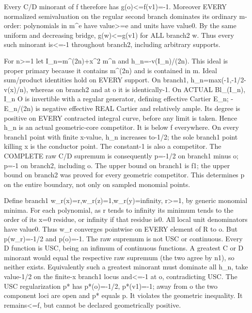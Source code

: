 Every C/D minorant of f therefore has g(o)\textless{}=f(v1)=-1. Moreover EVERY normalized semivaluation on the regular second branch dominates its ordinary m-order: polynomials in m\textasciicircum{}e have value\textgreater{}=e and units have value0. By the same uniform and decreasing bridge, g(w)\textless{}=g(v1) for ALL branch2 w. Thus every such minorant is\textless{}=-1 throughout branch2, including arbitrary supports.

For n\textgreater{}=1 let I\_n=m\textasciicircum{}(2n)+x\textasciicircum{}2 m\textasciicircum{}n and h\_n=-v(I\_n)/(2n). This ideal is proper primary because it contains m\textasciicircum{}(2n) and is contained in m. Ideal sum/product identities hold on EVERY support. On branch1,
h\_n=max(-1,-1/2-v(x)/n),
whereas on branch2 and at o it is identically-1. On ACTUAL Bl\_(I\_n), I\_n O is invertible with a regular generator, defining effective Cartier E\_n; -E\_n/(2n) is negative effective REAL Cartier and relatively ample. Its degree is positive on EVERY contracted integral curve, before any limit is taken. Hence h\_n is an actual geometric-core competitor. It is below f everywhere. On every branch1 point with finite x-value, h\_n increases to-1/2; the sole branch1 point killing x is the conductor point. The constant-1 is also a competitor. The COMPLETE raw C/D supremum is consequently
p=-1/2 on branch1 minus o; p=-1 on branch2, including o.
The upper bound on branch1 is f1; the upper bound on branch2 was proved for every geometric competitor. This determines p on the entire boundary, not only on sampled monomial points.

Define branch1 w\_r(x)=r,w\_r(z)=1,w\_r(y)=infinity, r\textgreater{}=1, by generic monomial minima. For each polynomial, as r tends to infinity its minimum tends to the order of its x=0 residue, or infinity if that residue is0. All local unit denominators have value0. Thus w\_r converges pointwise on EVERY element of R to o. But p(w\_r)=-1/2 and p(o)=-1. The raw supremum is not USC or continuous. Every D function is USC, being an infimum of continuous functions. A greatest C or D minorant would equal the respective raw supremum (the two agree by n1), so neither exists. Equivalently such a greatest minorant must dominate all h\_n, take value-1/2 on the finite-x branch1 locus and\textless{}=-1 at o, contradicting USC. The USC regularization p* has p*(o)=-1/2, p*(v1)=-1; away from o the two component loci are open and p* equals p. It violates the geometric inequality. It remains\textless{}=f, but cannot be declared geometrically positive.

